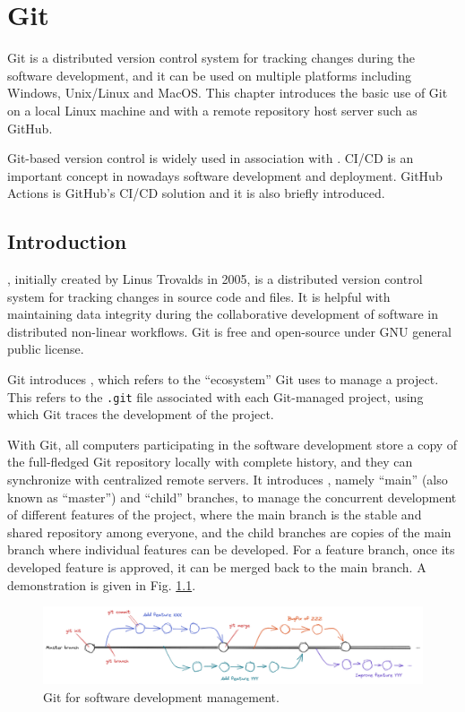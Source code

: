 \chapter{Git} \label{ch:git}

Git is a distributed version control system for tracking changes during the software development, and it can be used on multiple platforms including Windows, Unix/Linux and MacOS. This chapter introduces the basic use of Git on a local Linux machine and with a remote repository host server such as GitHub. 

Git-based version control is widely used in association with . CI/CD is an important concept in nowadays software development and deployment. GitHub Actions is GitHub's CI/CD solution and it is also briefly introduced.

\section{Introduction}

, initially created by Linus Trovalds in 2005, is a distributed version control system for tracking changes in source code and files. It is helpful with maintaining data integrity during the collaborative development of software in distributed non-linear workflows. Git is free and open-source under GNU general public license.

Git introduces , which refers to the ``ecosystem'' Git uses to manage a project. This refers to the \verb|.git| file associated with each Git-managed project, using which Git traces the development of the project. 

With Git, all computers participating in the software development store a copy of the full-fledged Git repository locally with complete history, and they can synchronize with centralized remote servers. It introduces , namely ``main'' (also known as ``master'') and ``child'' branches, to manage the concurrent development of different features of the project, where the main branch is the stable and shared repository among everyone, and the child branches are copies of the main branch where individual features can be developed. For a feature branch, once its developed feature is approved, it can be merged back to the main branch. A demonstration is given in Fig. \ref{ch:sma:fig:gitflow}.
\begin{figure}[htbp]
	\centering
	\includegraphics[width=350pt]{chapters/part-3/figures/gitflow.png}
	\caption{Git for software development management.} \label{ch:sma:fig:gitflow}
\end{figure}

